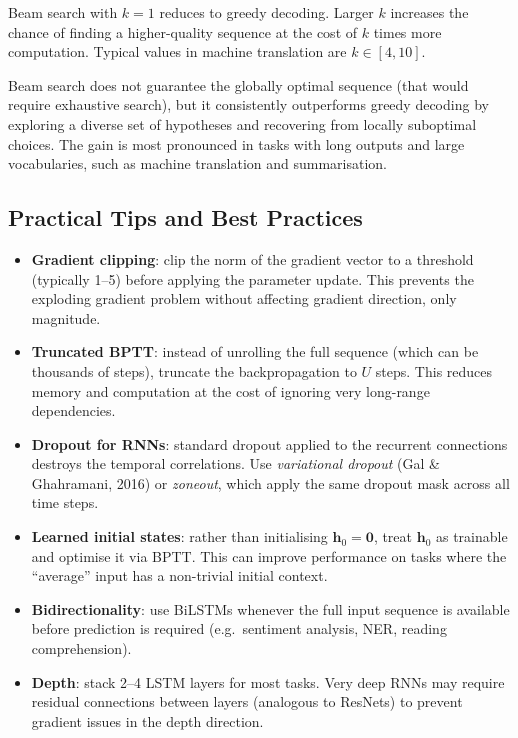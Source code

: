 \documentclass[11pt,a4paper]{article}
\begin{document}
Beam search with $k = 1$ reduces to greedy decoding. Larger $k$ increases the chance of finding a higher-quality sequence at the cost of $k$ times more computation. Typical values in machine translation are $k \in [4, 10]$.

\begin{insightbox}
Beam search does not guarantee the globally optimal sequence (that would require exhaustive search), but it consistently outperforms greedy decoding by exploring a diverse set of hypotheses and recovering from locally suboptimal choices. The gain is most pronounced in tasks with long outputs and large vocabularies, such as machine translation and summarisation.
\end{insightbox}

\subsection{Practical Tips and Best Practices}
\label{sec:rnn_tips}

\begin{itemize}
  \item \textbf{Gradient clipping}: clip the norm of the gradient vector to a threshold (typically 1--5) before applying the parameter update. This prevents the exploding gradient problem without affecting gradient direction, only magnitude.
  \item \textbf{Truncated BPTT}: instead of unrolling the full sequence (which can be thousands of steps), truncate the backpropagation to $U$ steps. This reduces memory and computation at the cost of ignoring very long-range dependencies.
  \item \textbf{Dropout for RNNs}: standard dropout applied to the recurrent connections destroys the temporal correlations. Use \emph{variational dropout} (Gal \& Ghahramani, 2016) or \emph{zoneout}, which apply the same dropout mask across all time steps.
  \item \textbf{Learned initial states}: rather than initialising $\mathbf{h}_0 = \mathbf{0}$, treat $\mathbf{h}_0$ as trainable and optimise it via BPTT. This can improve performance on tasks where the ``average'' input has a non-trivial initial context.
  \item \textbf{Bidirectionality}: use BiLSTMs whenever the full input sequence is available before prediction is required (e.g.\ sentiment analysis, NER, reading comprehension).
  \item \textbf{Depth}: stack 2--4 LSTM layers for most tasks. Very deep RNNs may require residual connections between layers (analogous to ResNets) to prevent gradient issues in the depth direction.
\end{itemize}
\end{document}
